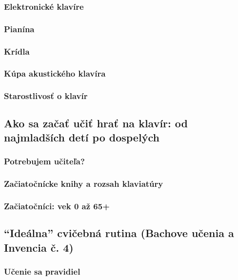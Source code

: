 \subsubsection{Elektronické klavíre}

\subsubsection{Pianína}

\subsubsection{Krídla}

\subsubsection{Kúpa akustického klavíra}

\subsubsection{Starostlivosť o klavír}

\subsection{Ako sa začať učiť hrať na klavír: od najmladších detí po dospelých}

\subsubsection{Potrebujem učiteľa?}

\subsubsection{Začiatočnícke knihy a rozsah klaviatúry}

\subsubsection{Začiatočníci: vek 0 až 65+}

\subsection{“Ideálna” cvičebná rutina (Bachove učenia a Invencia č. 4)}

\subsubsection{Učenie sa pravidiel}

